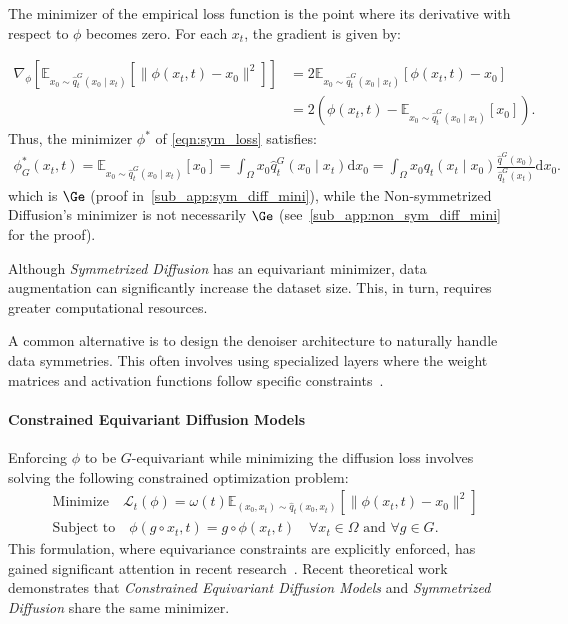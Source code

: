 The minimizer of the empirical loss function is the point where its derivative with respect to \( \phi \) becomes zero. For each \( x_t \), the gradient is given by:  

\begin{align}
    \nabla_\phi \left[ \mathbb{E}_{x_0 \sim \hat{q}^G_t(x_0 \mid x_t)} \left[ \| \phi(x_t, t) - x_0 \|^2 \right] \right] &= 2 \mathbb{E}_{x_0 \sim \hat{q}^G_t(x_0 \mid x_t)} \left[  \phi(x_t, t) - x_0  \right] \nonumber \\
    &= 2\left(\phi(x_t, t) -  \mathbb{E}_{x_0 \sim \hat{q}^G_t(x_0 \mid x_t)}[x_0] \right)\nonumber.
\end{align}  
Thus, the minimizer \( \phi^* \) of \cref{eqn:sym_loss} satisfies:  
\begin{align*}
    \phi^*_G(x_t, t) = \mathbb{E}_{x_0 \sim \hat{q}^G_t(x_0 \mid x_t)}[x_0]  = \int_\Omega x_0 \hat{q}^G_t(x_0 \mid x_t) \mathrm{d}x_0 = \int_\Omega x_0 q_t(x_t \mid x_0) \frac{\hat{q}^G(x_0)}{\hat{q}^G_t(x_t)} \mathrm{d}x_0 .
\end{align*}
which is \( \Ge \) (proof in~\cref{sub_app:sym_diff_mini}), while the Non-symmetrized Diffusion's minimizer is not necessarily \(\Ge\) (see~\cref{sub_app:non_sym_diff_mini} for the proof). 

Although \emph{Symmetrized Diffusion} has an equivariant minimizer, data augmentation can significantly increase the dataset size. This, in turn, requires greater computational resources. 

A common alternative is to design the denoiser architecture to naturally handle data symmetries. This often involves using specialized layers where the weight matrices and activation functions follow specific constraints~. 

\paragraph{Constrained Equivariant Diffusion Models} Enforcing \( \phi \) to be \( G \)-equivariant while minimizing the diffusion loss involves solving the following constrained optimization problem:
\begin{align} 
\label{eqn:constraint_problem}
&\text{Minimize} \quad \mathcal{L}_t(\phi) = \omega(t) \mathbb{E}_{(x_0, x_t) \sim \hat{q}_t(x_0, x_t)} [\| \phi(x_t, t) - x_0 \|^2]  \\
&\text{Subject to} \quad \phi(g \circ x_t, t) = g \circ \phi(x_t, t) \quad \forall x_t \in \Omega \text{ and } \forall g \in G. \nonumber 
\end{align}
This formulation, where equivariance constraints are explicitly enforced, has gained significant attention in recent research~. Recent theoretical work~ demonstrates that \emph{Constrained Equivariant Diffusion Models} and \emph{Symmetrized Diffusion} share the same minimizer.


